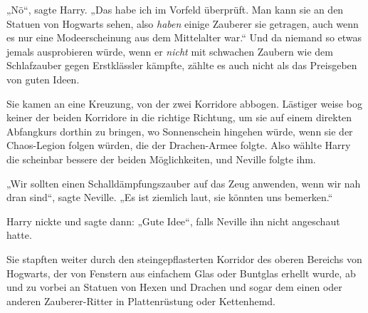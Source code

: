 „Nö“, sagte Harry. „Das habe ich im Vorfeld überprüft. Man kann sie an den Statuen von Hogwarts sehen, also \emph{haben} einige Zauberer sie getragen, auch wenn es nur eine Modeerscheinung aus dem Mittelalter war.“ Und da niemand so etwas jemals ausprobieren würde, wenn er \emph{nicht} mit schwachen Zaubern wie dem Schlafzauber gegen Erstklässler kämpfte, zählte es auch nicht als das Preisgeben von guten Ideen.

Sie kamen an eine Kreuzung, von der zwei Korridore abbogen. Lästiger weise bog keiner der beiden Korridore in die richtige Richtung, um sie auf einem direkten Abfangkurs dorthin zu bringen, wo Sonnenschein hingehen würde, wenn sie der Chaos-Legion folgen würden, die der Drachen-Armee folgte. Also wählte Harry die scheinbar bessere der beiden Möglichkeiten, und Neville folgte ihm.

„Wir sollten einen Schalldämpfungszauber auf das Zeug anwenden, wenn wir nah dran sind“, sagte Neville. „Es ist ziemlich laut, sie könnten uns bemerken.“

Harry nickte und sagte dann: „Gute Idee“, falls Neville ihn nicht angeschaut hatte.

Sie stapften weiter durch den steingepflasterten Korridor des oberen Bereichs von Hogwarts, der von Fenstern aus einfachem Glas oder Buntglas erhellt wurde, ab und zu vorbei an Statuen von Hexen und Drachen und sogar dem einen oder anderen Zauberer-Ritter in Plattenrüstung oder Kettenhemd.

